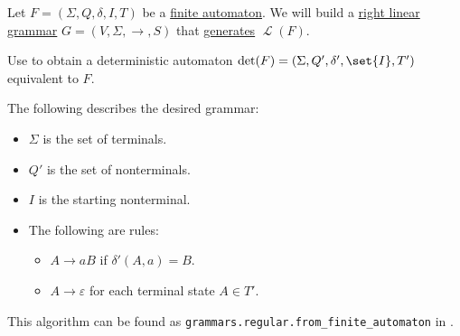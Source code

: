 \begin{algorithm}\label{alg:right_linear_grammar_from_finite_automaton}
  Let \( F = (\Sigma, Q, \delta, I, T) \) be a \hyperref[def:finite_automaton]{finite automaton}. We will build a \hyperref[def:chomsky_hierarchy/regular]{right linear grammar} \( G = (V, \Sigma, \to, S) \) that \hyperref[def:formal_grammar/language]{generates} \( \mscrL(F) \).

  \begin{thmenum}
     Use  to obtain a deterministic automaton \( \det(F) = (\Sigma, Q', \delta', \set{ I }, T') \) equivalent to \( F \).

     The following describes the desired grammar:
    \begin{itemize}
      \item \( \Sigma \) is the set of terminals.
      \item \( Q' \) is the set of nonterminals.
      \item \( I \) is the starting nonterminal.
      \item The following are rules:
      \begin{itemize}
        \item \( A \to aB \) if \( \delta'(A, a) = B \).
        \item \( A \to \varepsilon \) for each terminal state \( A \in T' \).
      \end{itemize}
    \end{itemize}
  \end{thmenum}
\end{algorithm}
\begin{comments}
  \item This algorithm can be found as \texttt{grammars.regular.from\_finite\_automaton} in \cite{code}.
\end{comments}

